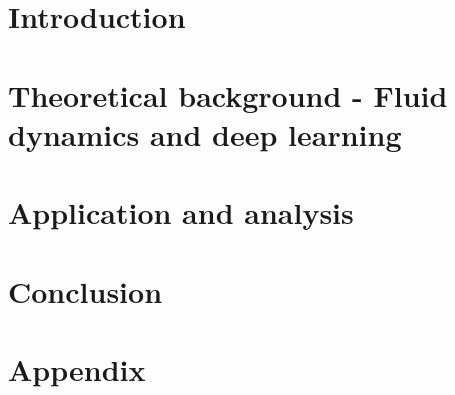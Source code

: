 
\addtolength{\evensidemargin}{-12mm}

%
%
\part[Introduction]{Introduction}
\label{part:Intro}


\part[Theoretical background]{Theoretical background - Fluid dynamics and deep learning}
\label{part:Theory}


\part[Application and analysis]{Application and analysis}
\label{part:Method}



% 
\part[Conclusion]{Conclusion}
\label{part:Conclusion}

%
%
\part*{Appendix}

\appendix %


